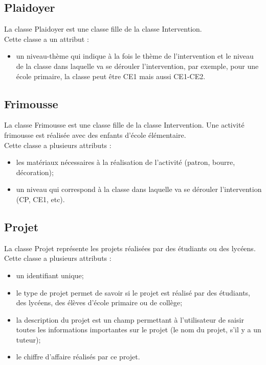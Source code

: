 \documentclass[asi, sansVersion]{picInsa}
\begin{document}
\subsection*{Plaidoyer}
La classe Plaidoyer est une classe fille de la classe Intervention. \\
Cette classe a un attribut : 
\begin{itemize}
\item un niveau-thème qui indique à la fois le thème de l'intervention et le niveau de la classe dans laquelle va se dérouler l'intervention, par exemple, pour une école primaire, la classe peut être CE1 mais aussi CE1-CE2.
\end{itemize}

\subsection*{Frimousse}
La classe Frimousse est une classe fille de la classe Intervention. Une activité frimousse est réalisée avec des enfants d'école élémentaire. \\
Cette classe a plusieurs attributs :
\begin{itemize}
\item les matériaux nécessaires à la réalisation de l'activité (patron, bourre, décoration); %
\item un niveau qui correspond à la classe dans laquelle va se dérouler l'intervention (CP, CE1, etc).
\end{itemize}

\subsection*{Projet}
La classe Projet représente les projets réalisées par des étudiants ou des lycéens.\\
Cette classe a plusieurs attributs : 
\begin{itemize}
\item un identifiant unique;
\item le type de projet permet de savoir si le projet est réalisé par des étudiants, des lycéens, des élèves d'école primaire ou de collège; 
\item la description du projet est un champ permettant à l'utilisateur de saisir toutes les informations importantes sur le projet (le nom du projet, s'il y a un tuteur);
\item le chiffre d'affaire réalisés par ce projet.
\end{itemize}
\end{document}
